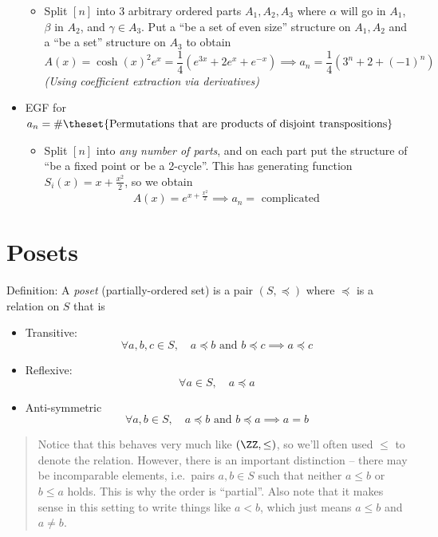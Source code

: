 \begin{itemize}
  \begin{itemize}
  \tightlist
  \item
    Split \([n]\) into 3 arbitrary ordered parts \(A_1, A_2, A_3\) where
    \(\alpha\) will go in \(A_1\), \(\beta\) in \(A_2\), and
    \(\gamma \in A_3\). Put a ``be a set of even size'' structure on
    \(A_1, A_2\) and a ``be a set'' structure on \(A_3\) to obtain \[
    A(x) = \cosh(x)^2 e^x = \frac{1}{4}(e^{3x} + 2e^x + e^{-x}) \implies a_n = \frac{1}{4}(3^n + 2 + (-1)^n)
    \] \emph{(Using coefficient extraction via derivatives)}
  \end{itemize}
\item
  EGF for
  \(a_n = \#\theset{\text{Permutations that are products of disjoint transpositions}}\)

  \begin{itemize}
  \tightlist
  \item
    Split \([n]\) into \emph{any number of parts}, and on each part put
    the structure of ``be a fixed point or be a 2-cycle''. This has
    generating function \(S_i(x) = x + \frac{x^2}{2}\), so we obtain \[
    A(x) = e^{x + \frac{x^2}{2}} \implies a_n = \text{ complicated}
    \]
  \end{itemize}
\end{itemize}

\hypertarget{posets}{%
\section{Posets}\label{posets}}

Definition: A \emph{poset} (partially-ordered set) is a pair
\((S, \preceq)\) where \(\preceq\) is a relation on \(S\) that is

\begin{itemize}
\tightlist
\item
  Transitive: \[
  \forall a,b,c \in S,\quad a \preceq b \text{ and } b \preceq c \implies a \preceq c
  \]
\item
  Reflexive: \[
  \forall a\in S,\quad a \preceq a
  \]
\item
  Anti-symmetric \[
  \forall a,b\in S,\quad a \preceq b \text{ and } b \preceq a \implies a = b
  \]
\end{itemize}

\begin{quote}
Notice that this behaves very much like \((\ZZ, \leq)\), so we'll often
used \(\leq\) to denote the relation. However, there is an important
distinction -- there may be incomparable elements, i.e.~pairs
\(a,b \in S\) such that neither \(a\leq b\) or \(b\leq a\) holds. This
is why the order is ``partial''. Also note that it makes sense in this
setting to write things like \(a< b\), which just means \(a\leq b\) and
\(a\neq b\).
\end{quote}

